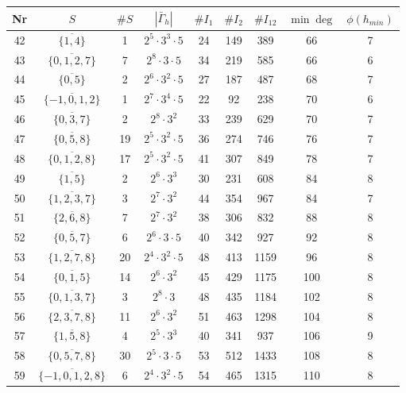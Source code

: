 \documentclass[a4paper,11pt]{article}
\begin{document}
\begin{table}
\begin{center}
{\scriptsize
\begin{tabular}{|c|c|c|c|c|c|c|c|c|}
\hline
Nr & $S$ & $\# S$ &  $|\bar \Gamma_h|$  & $\# I_1$  & $\# I_2$ & $\# I_{12}$ & $\min \deg$ & $\phi(h_{min})$\\
\hline
42 & $\overline{\{1,4\}}$ & 1 & $2^{5} \cdot 3^{3} \cdot 5$ & 24 & 149 & 389 & 66 & 7\\
43 & $\overline{\{0,1,2,7\}}$ & 7 & $2^{8} \cdot 3 \cdot 5$ & 34 & 219 & 585 & 66 & 6\\
44 & $\overline{\{0,5\}}$ & 2 & $2^{6} \cdot 3^{2} \cdot 5$ & 27 & 187 & 487 & 68 & 7\\
45 & $\overline{\{-1,0,1,2\}}$ & 1 & $2^{7} \cdot 3^{4} \cdot 5$ & 22 & 92 & 238 & 70 & 6\\
46 & $\overline{\{0,3,7\}}$ & 2 & $2^{8} \cdot 3^{2}$ & 33 & 239 & 629 & 70 & 7\\
47 & $\overline{\{0,5,8\}}$ & 19 & $2^{5} \cdot 3^{2} \cdot 5$ & 36 & 274 & 746 & 76 & 7\\
48 & $\overline{\{0,1,2,8\}}$ & 17 & $2^{5} \cdot 3^{2} \cdot 5$ & 41 & 307 & 849 & 78 & 7\\
49 & $\overline{\{1,5\}}$ & 2 & $2^{6} \cdot 3^{3}$ & 30 & 231 & 608 & 84 & 8\\
50 & $\overline{\{1,2,3,7\}}$ & 3 & $2^{7} \cdot 3^{2}$ & 44 & 354 & 967 & 84 & 7\\
51 & $\overline{\{2,6,8\}}$ & 7 & $2^{7} \cdot 3^{2}$ & 38 & 306 & 832 & 88 & 8\\
52 & $\overline{\{0,5,7\}}$ & 6 & $2^{6} \cdot 3 \cdot 5$ & 40 & 342 & 927 & 92 & 8\\
53 & $\overline{\{1,2,7,8\}}$ & 20 & $2^{4} \cdot 3^{2} \cdot 5$ & 48 & 413 & 1159 & 96 & 8\\
54 & $\overline{\{0,1,5\}}$ & 14 & $2^{6} \cdot 3^{2}$ & 45 & 429 & 1175 & 100 & 8\\
55 & $\overline{\{0,1,3,7\}}$ & 3 & $2^{8} \cdot 3$ & 48 & 435 & 1184 & 102 & 8\\
56 & $\overline{\{2,3,7,8\}}$ & 11 & $2^{6} \cdot 3^{2}$ & 51 & 463 & 1298 & 104 & 8\\
57 & $\overline{\{1,5,8\}}$ & 4 & $2^{5} \cdot 3^{3}$ & 40 & 341 & 937 & 106 & 9\\
58 & $\overline{\{0,5,7,8\}}$ & 30 & $2^{5} \cdot 3 \cdot 5$ & 53 & 512 & 1433 & 108 & 8\\
59 & $\overline{\{-1,0,1,2,8\}}$ & 6 & $2^{4} \cdot 3^{2} \cdot 5$ & 54 & 465 & 1315 & 110 & 8\\

\end{tabular}}
\end{center}
\end{table}
\end{document}
